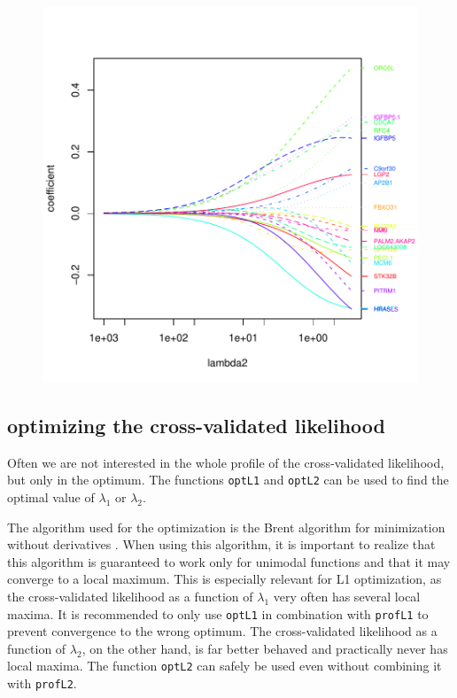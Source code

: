\documentclass[a4paper]{article}
\newcommand{\Robject}[1]{{\texttt{#1}}}
\newcommand{\Rfunction}[1]{{\texttt{#1}}}
\begin{document}
\begin{figure}
\begin{Schunk}
\end{Schunk}
\includegraphics{penalized-profpathplot}
\end{figure}

\subsection{optimizing the cross-validated likelihood}

Often we are not interested in the whole profile of the cross-validated likelihood, but only in the optimum. The functions \Rfunction{optL1} and \Rfunction{optL2} can be used to find the optimal value of $\lambda_1$ or $\lambda_2$.

The algorithm used for the optimization is the Brent algorithm for minimization without derivatives \citep[][see also \Robject{help(optimize)}]{Brent1973}. When using this algorithm, it is important to realize that this algorithm is guaranteed to work only for unimodal functions and that it may converge to a local maximum. This is especially relevant for L1 optimization, as the cross-validated likelihood as a function of $\lambda_1$ very often has several local maxima. It is recommended to only use \Rfunction{optL1} in combination with \Rfunction{profL1} to prevent convergence to the wrong optimum. The cross-validated likelihood as a function of $\lambda_2$, on the other hand, is far better behaved and practically never has local maxima. The function \Rfunction{optL2} can safely be used even without combining it with \Rfunction{profL2}.
\end{document}
